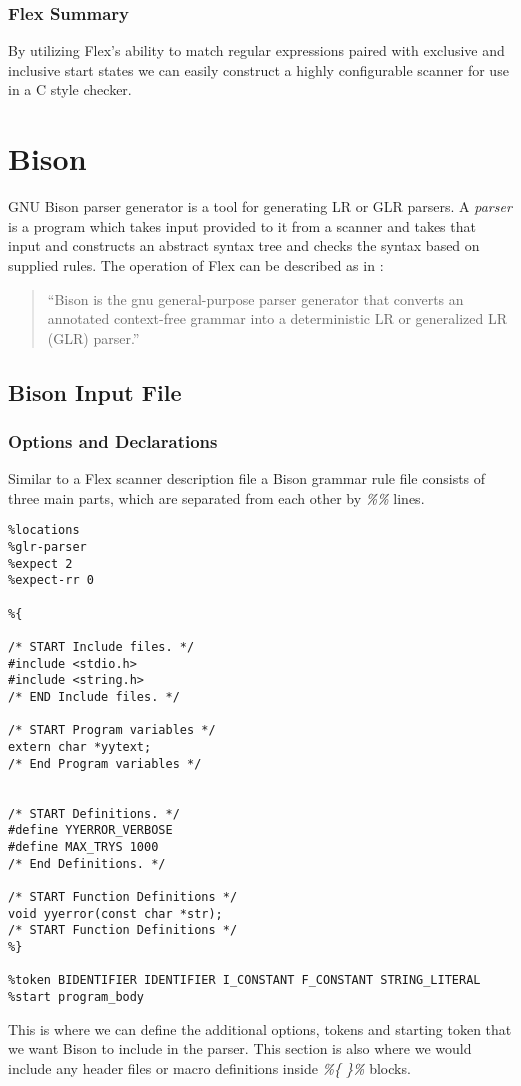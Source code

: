 \subsubsection{Flex Summary}
By utilizing Flex's ability to match regular expressions paired with exclusive 
and inclusive start states we can easily construct a highly configurable 
scanner for use in a C style checker. 

\section{Bison}
GNU Bison parser generator is a tool for generating LR or GLR parsers.
A \emph{parser} is a program which takes input provided to it from a scanner
and takes that input and constructs an abstract syntax tree and checks the 
syntax based on supplied rules. The operation of Flex can be described as in 
\citep*{BISON}:
\begin{quote}
``Bison is the gnu general-purpose parser generator that converts an annotated 
context-free grammar into a deterministic LR or generalized LR (GLR) parser.'' 
\end{quote}


\subsection{Bison Input File}

\subsubsection{Options and Declarations}

Similar to a Flex scanner description file a Bison grammar rule file consists 
of three main parts, which are separated from each other by \emph{\%\%} lines.
\begingroup
\begin{verbatim}
%locations
%glr-parser
%expect 2
%expect-rr 0

%{

/* START Include files. */
#include <stdio.h>
#include <string.h>
/* END Include files. */

/* START Program variables */
extern char *yytext;
/* End Program variables */


/* START Definitions. */
#define YYERROR_VERBOSE
#define MAX_TRYS 1000
/* End Definitions. */

/* START Function Definitions */
void yyerror(const char *str);
/* START Function Definitions */
%}

%token BIDENTIFIER IDENTIFIER I_CONSTANT F_CONSTANT STRING_LITERAL
%start program_body

\end{verbatim}
\endgroup
\noindent This is where we can define the additional options, tokens and 
starting token that we want Bison to include in the parser. This section is 
also where we would include any header files or macro definitions inside 
\emph{\%\{ \}\%} blocks.


